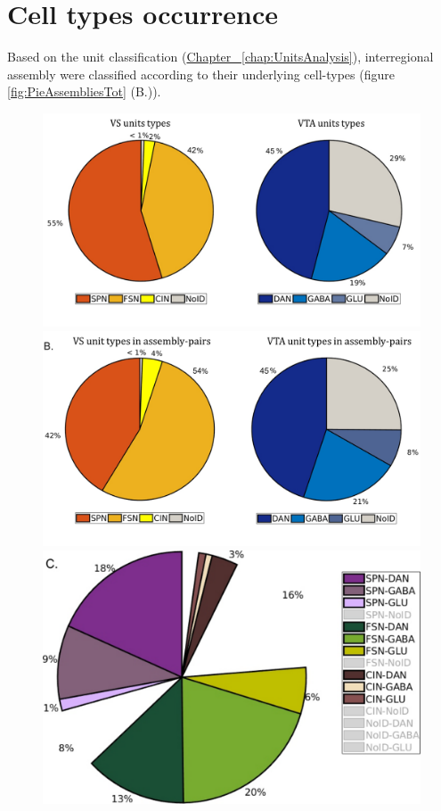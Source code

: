 \section{Cell types occurrence}
\label{sec:AsseTypes}
Based on the unit classification (\hyperref[chap:UnitsAnalysis]{Chapter~ \ref*{chap:UnitsAnalysis}}), interregional assembly were classified according to their underlying cell-types (figure \ref{fig:PieAssembliesTot} (B.)).
\begin{figure}[H]
    \centering
    \includegraphics[scale=0.4]{figures/PieRegions1.pdf}
    \includegraphics[scale=0.4]{figures/PieAsNotAs.pdf}
    \includegraphics[scale=0.4]{figures/PieAssembliesTot1.pdf}

\end{figure}
